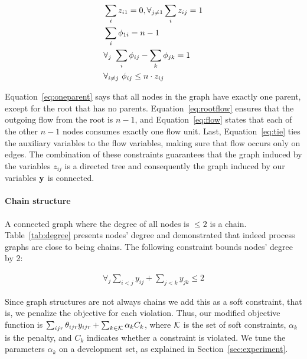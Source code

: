 \begin{align}
\small &\sum_{i} z_{i1} =0, \forall_{j \neq 1} \sum_{i} z_{ij}=1 \label{eq:oneparent} \\ 
&\sum_{i} \phi_{1i}=n-1 \label{eq:rootflow} \\ 
&\forall_{j} \ \sum_{i} \phi_{ij} - \sum_{k} \phi_{jk}=1 \label{eq:flow} \\
&\forall_{i \neq j} \ \phi_{ij} \leq n \cdot z_{ij} \label{eq:tie} 
\end{align}

Equation~\ref{eq:oneparent} says that all nodes in the graph have exactly one parent, except for the root that has no parents. Equation~\ref{eq:rootflow} ensures that the outgoing flow from the root is $n-1$, and Equation~\ref{eq:flow} states that each of the other $n-1$ nodes consumes exactly one flow unit. Last, Equation~\ref{eq:tie} ties the auxiliary variables to the flow variables, making sure that flow occurs only on edges. The combination of these constraints guarantees that the graph induced by the variables $z_{ij}$ is a directed tree and consequently the graph induced by our variables $\mathbf{y}$ is connected.

\paragraph{Chain structure} 
A connected graph where the degree of all nodes is $\leq 2$ is a chain. Table~\ref{tab:degree} presents nodes' degree and demonstrated that indeed process graphs are close to being chains. The following constraint bounds nodes' degree by 2:

\begin{align}
\forall_j \sum_{i<j} y_{ij} + \sum_{j<k} y_{jk} \leq 2
\end{align}

Since graph structures are not always chains we add this as a soft constraint, that is, we penalize the objective for each violation. Thus, our modified objective function is $\sum_{ijr} \theta_{ijr} y_{ijr} + \sum_{k \in \mathcal{K}} \alpha_k C_k$, where $\mathcal{K}$ is the set of soft constraints, $\alpha_k$ is the penalty, and $C_k$ indicates whether a constraint is violated. We tune the parameters $\alpha_k$ on a development set, as explained in Section~\ref{sec:experiment}.

